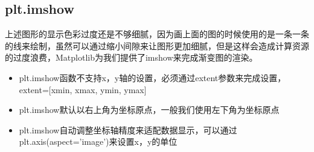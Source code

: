 \documentclass[letterpaper,10pt,english]{sphinxhowto}
\begin{document}
%
\begin{sphinxVerbatim}[commandchars=\\\{\}]
  
\end{sphinxVerbatim}



\subsection{plt.imshow}
\label{\detokenize{_u5bc6_u5ea6_u56fe_u548c_u7b49_u9ad8_u7ebf:plt-imshow}}
上述图形的显示色彩过度还是不够细腻，因为画上面的图的时候使用的是一条一条的线来绘制，虽然可以通过缩小间隙来让图形更加细腻，但是这样会造成计算资源的过度浪费，Matplotlib为我们提供了imshow来完成渐变图的渲染。
\begin{itemize}
\item {} 
plt.imshow函数不支持x，y轴的设置，必须通过extent参数来完成设置，extent={[}xmin, xmax, ymin, ymax{]}

\item {} 
plt.imshow默认以右上角为坐标原点，一般我们使用左下角为坐标原点

\item {} 
plt.imshow自动调整坐标轴精度来适配数据显示，可以通过plt.axis(aspect=’image’)来设置x，y的单位

\end{itemize}

%
\begin{sphinxVerbatim}[commandchars=\\\{\}]

 \PYG{p}{[}   \PYG{p}{]}  

\end{sphinxVerbatim}
\end{document}
